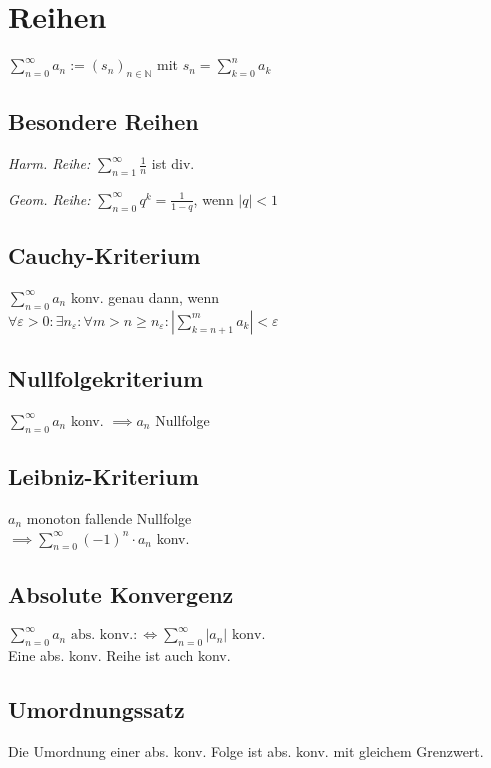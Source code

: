 \section*{Reihen}

$\displaystyle \sum_{n=0}^\infty a_n := (s_n)_{n\in\mathbb{N}}$ mit
$\displaystyle s_n = \sum_{k=0}^n a_k$

\subsection*{Besondere Reihen}

\textit{Harm. Reihe:}
$\displaystyle \sum_{n=1}^\infty\frac{1}{n}$ ist div.

\textit{Geom. Reihe:}
$\displaystyle \sum_{n=0}^\infty q^k = \frac{1}{1-q}$, wenn $|q|<1$

\subsection*{Cauchy-Kriterium}
$\displaystyle \sum_{n=0}^\infty a_n$ konv. genau dann, wenn \\
$\displaystyle \forall \varepsilon>0: \exists n_\varepsilon: \forall m>n\ge n_\varepsilon: \left|\sum_{k=n+1}^m a_k\right|<\varepsilon$

\subsection*{Nullfolgekriterium}
$\displaystyle \sum_{n=0}^\infty a_n$ konv. $\implies a_n$ Nullfolge

\subsection*{Leibniz-Kriterium}
$a_n$ monoton fallende Nullfolge \\
$\displaystyle \implies \sum_{n=0}^\infty (-1)^n\cdot a_n$ konv.

\subsection*{Absolute Konvergenz}
$\displaystyle \sum_{n=0}^\infty a_n \text{ abs. konv.} :\iff \sum_{n=0}^\infty|a_n| \text{ konv.}$ \\
Eine abs. konv. Reihe ist auch konv.

\subsection*{Umordnungssatz}
Die Umordnung einer abs. konv. Folge ist abs. konv. mit gleichem Grenzwert.

